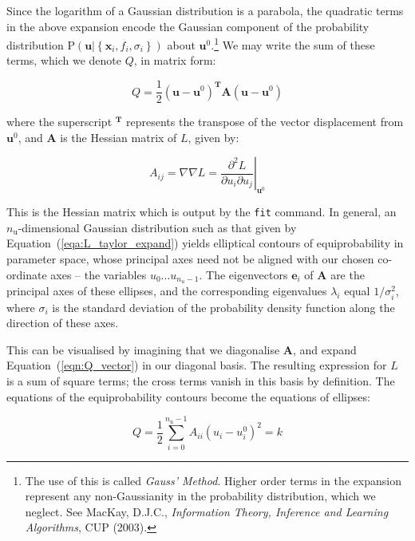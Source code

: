 Since the logarithm of a Gaussian distribution is a parabola, the quadratic
terms in the above expansion encode the Gaussian component of the probability
distribution $\mathrm{P}\left( \mathbf{u} | \left\{ \mathbf{x}_i, f_i, \sigma_i
\right\} \right)$ about $\mathbf{u}^0$.\footnote{The use of this is called
\textit{Gauss' Method}. Higher order terms in the expansion represent any
non-Gaussianity in the probability distribution, which we neglect. See MacKay,
D.J.C., \textit{Information Theory, Inference and Learning Algorithms}, CUP
(2003).} We may write the sum of these terms, which we denote $Q$, in matrix
form:

\begin{equation}
Q = \frac{1}{2} \left(\mathbf{u} - \mathbf{u}^0\right)^\mathbf{T} \mathbf{A} \left(\mathbf{u} - \mathbf{u}^0\right)
\label{eqn:Q_vector}
\end{equation}

\noindent where the superscript $^\mathbf{T}$ represents the transpose of the
vector displacement from $\mathbf{u}^0$, and $\mathbf{A}$ is the Hessian matrix
of $L$, given by:

\begin{equation}
A_{ij} = \nabla\nabla L = \left.\frac{\partial^2 L}{\partial u_i \partial u_j}\right|_{\mathbf{u}^0}
\end{equation}

This is the Hessian matrix which is output by the {\tt fit} command. In
general, an $n_\mathrm{u}$-dimensional Gaussian distribution such as that given
by Equation~(\ref{eqa:L_taylor_expand}) yields elliptical contours of
equiprobability in parameter space, whose principal axes need not be aligned
with our chosen co-ordinate axes -- the variables $u_0 ... u_{n_u-1}$. The
eigenvectors $\mathbf{e}_i$ of $\mathbf{A}$ are the principal axes of these
ellipses, and the corresponding eigenvalues $\lambda_i$ equal $1/\sigma_i^2$,
where $\sigma_i$ is the standard deviation of the probability density function
along the direction of these axes.

This can be visualised by imagining that we diagonalise $\mathbf{A}$, and
expand Equation~(\ref{eqn:Q_vector}) in our diagonal basis. The resulting
expression for $L$ is a sum of square terms; the cross terms vanish in this
basis by definition. The equations of the equiprobability contours become the
equations of ellipses:

\begin{equation}
Q = \frac{1}{2} \sum_{i=0}^{n_\mathrm{u}-1} A_{ii} \left(u_i - u^0_i\right)^2 = k
\end{equation}

